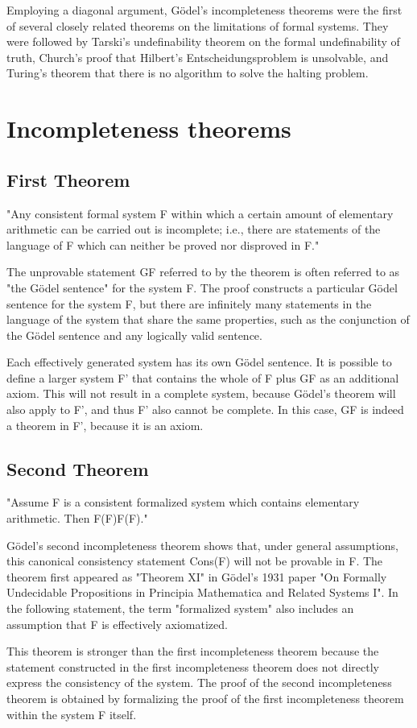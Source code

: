 \documentclass[a4paper,10pt]{article} %
\begin{document}
Employing a diagonal argument, Gödel's incompleteness theorems were the first of several closely related theorems on the limitations of formal systems. They were followed by Tarski's undefinability theorem on the formal undefinability of truth, Church's proof that Hilbert's Entscheidungsproblem is unsolvable, and Turing's theorem that there is no algorithm to solve the halting problem.

\section{Incompleteness theorems}
\subsection{First Theorem}
 "Any consistent formal system F within which a certain amount of elementary arithmetic can be carried out is incomplete; i.e., there are statements of the language of F which can neither be proved nor disproved in F."
 
 The unprovable statement GF referred to by the theorem is often referred to as "the Gödel sentence" for the system F. The proof constructs a particular Gödel sentence for the system F, but there are infinitely many statements in the language of the system that share the same properties, such as the conjunction of the Gödel sentence and any logically valid sentence.

Each effectively generated system has its own Gödel sentence. It is possible to define a larger system F’ that contains the whole of F plus GF as an additional axiom. This will not result in a complete system, because Gödel's theorem will also apply to F’, and thus F’ also cannot be complete. In this case, GF is indeed a theorem in F’, because it is an axiom.
 
 \subsection{Second Theorem}
 "Assume F is a consistent formalized system which contains elementary arithmetic. Then {\displaystyle F\not {}(F)}{\displaystyle F\not {}(F)}."
 
 Gödel's second incompleteness theorem shows that, under general assumptions, this canonical consistency statement Cons(F) will not be provable in F. The theorem first appeared as "Theorem XI" in Gödel's 1931 paper "On Formally Undecidable Propositions in Principia Mathematica and Related Systems I". In the following statement, the term "formalized system" also includes an assumption that F is effectively axiomatized.

This theorem is stronger than the first incompleteness theorem because the statement constructed in the first incompleteness theorem does not directly express the consistency of the system. The proof of the second incompleteness theorem is obtained by formalizing the proof of the first incompleteness theorem within the system F itself.
 
 
 
 
\end{document}
